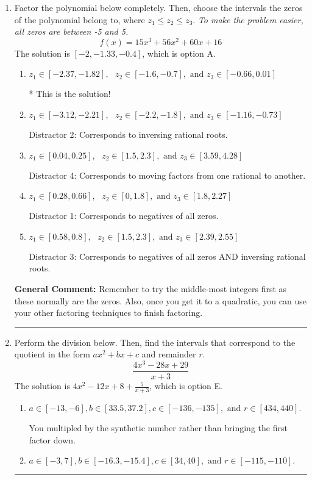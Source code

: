 \documentclass{extbook}[14pt]
\newcommand{\litem}[1]{\item #1

\rule{\textwidth}{0.4pt}}
\begin{document}
\begin{enumerate}\litem{
Factor the polynomial below completely. Then, choose the intervals the zeros of the polynomial belong to, where $z_1 \leq z_2 \leq z_3$. \textit{To make the problem easier, all zeros are between -5 and 5.}
\[ f(x) = 15x^{3} +56 x^{2} +60 x + 16 \]The solution is \( [-2, -1.33, -0.4] \), which is option A.\begin{enumerate}[label=\Alph*.]
\item \( z_1 \in [-2.37, -1.82], \text{   }  z_2 \in [-1.6, -0.7], \text{   and   } z_3 \in [-0.66, 0.01] \)

* This is the solution!
\item \( z_1 \in [-3.12, -2.21], \text{   }  z_2 \in [-2.2, -1.8], \text{   and   } z_3 \in [-1.16, -0.73] \)

 Distractor 2: Corresponds to inversing rational roots.
\item \( z_1 \in [0.04, 0.25], \text{   }  z_2 \in [1.5, 2.3], \text{   and   } z_3 \in [3.59, 4.28] \)

 Distractor 4: Corresponds to moving factors from one rational to another.
\item \( z_1 \in [0.28, 0.66], \text{   }  z_2 \in [0, 1.8], \text{   and   } z_3 \in [1.8, 2.27] \)

 Distractor 1: Corresponds to negatives of all zeros.
\item \( z_1 \in [0.58, 0.8], \text{   }  z_2 \in [1.5, 2.3], \text{   and   } z_3 \in [2.39, 2.55] \)

 Distractor 3: Corresponds to negatives of all zeros AND inversing rational roots.
\end{enumerate}

\textbf{General Comment:} Remember to try the middle-most integers first as these normally are the zeros. Also, once you get it to a quadratic, you can use your other factoring techniques to finish factoring.
}
\litem{
Perform the division below. Then, find the intervals that correspond to the quotient in the form $ax^2+bx+c$ and remainder $r$.
\[ \frac{4x^{3} -28 x + 29}{x + 3} \]The solution is \( 4x^{2} -12 x + 8 + \frac{5}{x + 3} \), which is option E.\begin{enumerate}[label=\Alph*.]
\item \( a \in [-13, -6], b \in [33.5, 37.2], c \in [-136, -135], \text{ and } r \in [434, 440]. \)

 You multipled by the synthetic number rather than bringing the first factor down.
\item \( a \in [-3, 7], b \in [-16.3, -15.4], c \in [34, 40], \text{ and } r \in [-115, -110]. \)


\end{enumerate}}
\end{enumerate}
\end{document}
